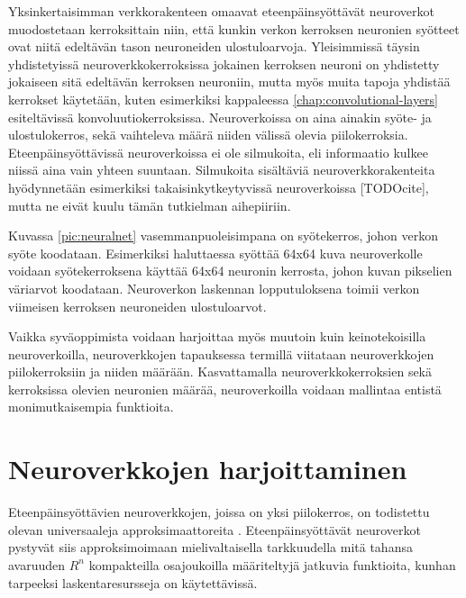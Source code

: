 \documentclass[finnish]{tktltiki2}
\theoremstyle{definition}
\theoremstyle{remark}
\begin{document}
  Yksinkertaisimman verkkorakenteen omaavat eteenpäinsyöttävät neuroverkot muodostetaan kerroksittain niin, että kunkin verkon kerroksen neuronien syötteet ovat niitä edeltävän tason neuroneiden ulostuloarvoja. 
  Yleisimmissä täysin yhdistetyissä neuroverkkokerroksissa jokainen kerroksen neuroni on yhdistetty jokaiseen sitä edeltävän kerroksen neuroniin, mutta myös muita tapoja yhdistää kerrokset käytetään, kuten esimerkiksi kappaleessa \ref{chap:convolutional-layers} esiteltävissä konvoluutiokerroksissa. Neuroverkoissa on aina ainakin syöte- ja ulostulokerros, sekä vaihteleva määrä niiden välissä olevia piilokerroksia.
  Eteenpäinsyöttävissä neuroverkoissa ei ole silmukoita, eli informaatio kulkee niissä aina vain yhteen suuntaan. Silmukoita sisältäviä neuroverkkorakenteita hyödynnetään esimerkiksi takaisinkytkeytyvissä neuroverkoissa [TODOcite], mutta ne eivät kuulu tämän tutkielman aihepiiriin.
  
  Kuvassa \ref{pic:neuralnet} vasemmanpuoleisimpana on syötekerros, johon verkon syöte koodataan. Esimerkiksi haluttaessa syöttää 64x64 kuva neuroverkolle voidaan syötekerroksena käyttää 64x64 neuronin kerrosta, johon kuvan pikselien väriarvot koodataan. Neuroverkon laskennan lopputuloksena toimii verkon viimeisen kerroksen neuroneiden ulostuloarvot.

  Vaikka syväoppimista voidaan harjoittaa myös muutoin kuin keinotekoisilla neuroverkoilla, neuroverkkojen tapauksessa termillä viitataan neuroverkkojen piilokerroksiin ja niiden määrään. Kasvattamalla neuroverkkokerroksien sekä kerroksissa olevien neuronien määrää, neuroverkoilla voidaan mallintaa entistä monimutkaisempia funktioita.

  \section{Neuroverkkojen harjoittaminen}
    \label{chap:neural-training}

  Eteenpäinsyöttävien neuroverkkojen, joissa on yksi piilokerros, on todistettu olevan universaaleja approksimaattoreita \cite{multilayer-feedforward-universal-approximators}. Eteenpäinsyöttävät neuroverkot pystyvät siis approksimoimaan mielivaltaisella tarkkuudella mitä tahansa avaruuden $R^n$ kompakteilla osajoukoilla määriteltyjä jatkuvia funktioita, kunhan tarpeeksi laskentaresursseja on käytettävissä.
  
\end{document}
